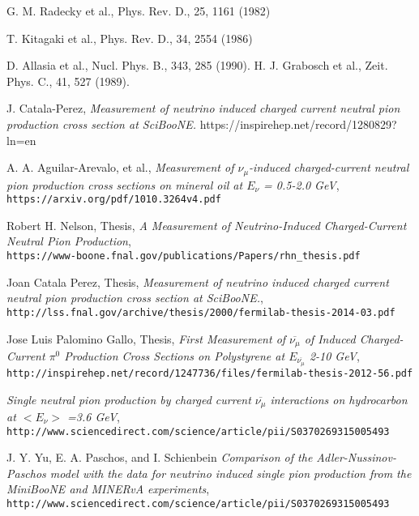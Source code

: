 \documentclass[12pt]{article}
\begin{document}
\begin{thebibliography}{20}
 G. M. Radecky et al., Phys. Rev. D., 25, 1161 (1982)
 
 T. Kitagaki et al., Phys. Rev. D., 34, 2554 (1986)
 
 D. Allasia et al., Nucl. Phys. B., 343, 285 (1990).
 H. J. Grabosch et al., Zeit. Phys. C., 41, 527 (1989).

J. Catala-Perez, \emph{Measurement of neutrino induced charged current neutral pion production cross section at SciBooNE.}
https://inspirehep.net/record/1280829?ln=en

  A. A. Aguilar-Arevalo, et al., \emph{Measurement of $\nu_\mu$-induced charged-current neutral pion production cross sections on mineral oil at $E_\nu$ = 0.5-2.0 GeV},\\
  \texttt{https://arxiv.org/pdf/1010.3264v4.pdf}

  Robert H. Nelson, Thesis, \emph{A Measurement of Neutrino-Induced Charged-Current Neutral Pion Production},\\
  \texttt{https://www-boone.fnal.gov/publications/Papers/rhn\_thesis.pdf}
  
  Joan Catala Perez, Thesis, \emph{Measurement of neutrino induced charged current neutral pion production cross section at SciBooNE.},\\
  \texttt{http://lss.fnal.gov/archive/thesis/2000/fermilab-thesis-2014-03.pdf}  

  Jose Luis Palomino Gallo, Thesis, \emph{First Measurement of $\overline{\nu_\mu}$ of Induced Charged-Current $\pi^0$ Production Cross Sections on Polystyrene at $E_{\overline{\nu_\mu}}$ 2-10 GeV},\\
  \texttt{http://inspirehep.net/record/1247736/files/fermilab-thesis-2012-56.pdf}  
  
   \emph{Single neutral pion production by charged current $\overline{\nu_\mu}$ interactions on hydrocarbon at $< E_\nu >$ =3.6 GeV},\\
  \texttt{http://www.sciencedirect.com/science/article/pii/S0370269315005493}  

  J. Y. Yu, E. A. Paschos, and I. Schienbein \emph{Comparison of the Adler-Nussinov-Paschos model with the data for neutrino induced single pion production from the MiniBooNE and MINERvA experiments},\\
  \texttt{http://www.sciencedirect.com/science/article/pii/S0370269315005493}  
  

\end{thebibliography}
\end{document}
